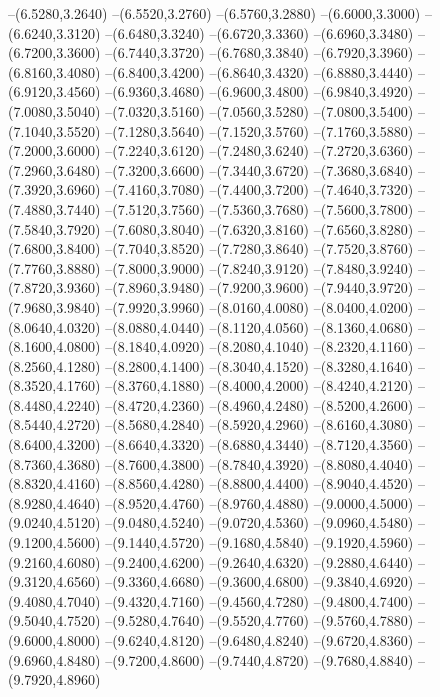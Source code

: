 {	--(6.5280,3.2640)
	--(6.5520,3.2760)
	--(6.5760,3.2880)
	--(6.6000,3.3000)
	--(6.6240,3.3120)
	--(6.6480,3.3240)
	--(6.6720,3.3360)
	--(6.6960,3.3480)
	--(6.7200,3.3600)
	--(6.7440,3.3720)
	--(6.7680,3.3840)
	--(6.7920,3.3960)
	--(6.8160,3.4080)
	--(6.8400,3.4200)
	--(6.8640,3.4320)
	--(6.8880,3.4440)
	--(6.9120,3.4560)
	--(6.9360,3.4680)
	--(6.9600,3.4800)
	--(6.9840,3.4920)
	--(7.0080,3.5040)
	--(7.0320,3.5160)
	--(7.0560,3.5280)
	--(7.0800,3.5400)
	--(7.1040,3.5520)
	--(7.1280,3.5640)
	--(7.1520,3.5760)
	--(7.1760,3.5880)
	--(7.2000,3.6000)
	--(7.2240,3.6120)
	--(7.2480,3.6240)
	--(7.2720,3.6360)
	--(7.2960,3.6480)
	--(7.3200,3.6600)
	--(7.3440,3.6720)
	--(7.3680,3.6840)
	--(7.3920,3.6960)
	--(7.4160,3.7080)
	--(7.4400,3.7200)
	--(7.4640,3.7320)
	--(7.4880,3.7440)
	--(7.5120,3.7560)
	--(7.5360,3.7680)
	--(7.5600,3.7800)
	--(7.5840,3.7920)
	--(7.6080,3.8040)
	--(7.6320,3.8160)
	--(7.6560,3.8280)
	--(7.6800,3.8400)
	--(7.7040,3.8520)
	--(7.7280,3.8640)
	--(7.7520,3.8760)
	--(7.7760,3.8880)
	--(7.8000,3.9000)
	--(7.8240,3.9120)
	--(7.8480,3.9240)
	--(7.8720,3.9360)
	--(7.8960,3.9480)
	--(7.9200,3.9600)
	--(7.9440,3.9720)
	--(7.9680,3.9840)
	--(7.9920,3.9960)
	--(8.0160,4.0080)
	--(8.0400,4.0200)
	--(8.0640,4.0320)
	--(8.0880,4.0440)
	--(8.1120,4.0560)
	--(8.1360,4.0680)
	--(8.1600,4.0800)
	--(8.1840,4.0920)
	--(8.2080,4.1040)
	--(8.2320,4.1160)
	--(8.2560,4.1280)
	--(8.2800,4.1400)
	--(8.3040,4.1520)
	--(8.3280,4.1640)
	--(8.3520,4.1760)
	--(8.3760,4.1880)
	--(8.4000,4.2000)
	--(8.4240,4.2120)
	--(8.4480,4.2240)
	--(8.4720,4.2360)
	--(8.4960,4.2480)
	--(8.5200,4.2600)
	--(8.5440,4.2720)
	--(8.5680,4.2840)
	--(8.5920,4.2960)
	--(8.6160,4.3080)
	--(8.6400,4.3200)
	--(8.6640,4.3320)
	--(8.6880,4.3440)
	--(8.7120,4.3560)
	--(8.7360,4.3680)
	--(8.7600,4.3800)
	--(8.7840,4.3920)
	--(8.8080,4.4040)
	--(8.8320,4.4160)
	--(8.8560,4.4280)
	--(8.8800,4.4400)
	--(8.9040,4.4520)
	--(8.9280,4.4640)
	--(8.9520,4.4760)
	--(8.9760,4.4880)
	--(9.0000,4.5000)
	--(9.0240,4.5120)
	--(9.0480,4.5240)
	--(9.0720,4.5360)
	--(9.0960,4.5480)
	--(9.1200,4.5600)
	--(9.1440,4.5720)
	--(9.1680,4.5840)
	--(9.1920,4.5960)
	--(9.2160,4.6080)
	--(9.2400,4.6200)
	--(9.2640,4.6320)
	--(9.2880,4.6440)
	--(9.3120,4.6560)
	--(9.3360,4.6680)
	--(9.3600,4.6800)
	--(9.3840,4.6920)
	--(9.4080,4.7040)
	--(9.4320,4.7160)
	--(9.4560,4.7280)
	--(9.4800,4.7400)
	--(9.5040,4.7520)
	--(9.5280,4.7640)
	--(9.5520,4.7760)
	--(9.5760,4.7880)
	--(9.6000,4.8000)
	--(9.6240,4.8120)
	--(9.6480,4.8240)
	--(9.6720,4.8360)
	--(9.6960,4.8480)
	--(9.7200,4.8600)
	--(9.7440,4.8720)
	--(9.7680,4.8840)
	--(9.7920,4.8960)
}
